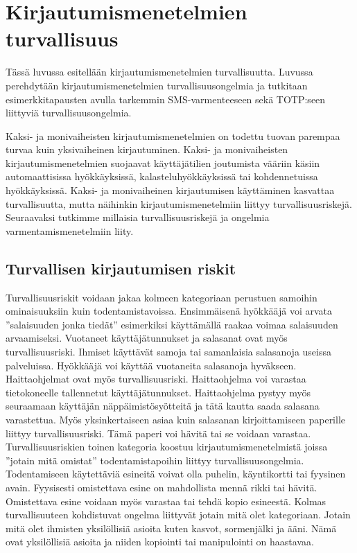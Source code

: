 \chapter{Kirjautumismenetelmien turvallisuus\label{Turvallisuus}}

Tässä luvussa esitellään kirjautumismenetelmien turvallisuutta. Luvussa perehdytään kirjautumismenetelmien turvallisuusongelmia ja tutkitaan esimerkkitapausten avulla tarkemmin SMS-varmenteeseen sekä TOTP:seen liittyviä turvallisuusongelmia. 

Kaksi- ja monivaiheisten kirjautumismenetelmien on todettu tuovan parempaa turvaa kuin yksivaiheinen kirjautuminen. Kaksi- ja monivaiheisten kirjautumismenetelmien suojaavat käyttäjätilien joutumista vääriin käsiin automaattisissa hyökkäyksissä, kalasteluhyökkäyksissä tai kohdennetuissa hyökkäyksissä. Kaksi- ja monivaiheinen kirjautumisen käyttäminen kasvattaa turvallisuutta, mutta näihinkin kirjautumismenetelmiin liittyy turvallisuusriskejä. Seuraavaksi tutkimme millaisia turvallisuusriskejä ja ongelmia varmentamismenetelmiin liity.

\section{Turvallisen kirjautumisen riskit}

Turvallisuusriskit voidaan jakaa kolmeen kategoriaan perustuen samoihin ominaisuuksiin kuin todentamistavoissa. Ensimmäisenä hyökkääjä voi arvata ”salaisuuden jonka tiedät” esimerkiksi käyttämällä raakaa voimaa salaisuuden arvaamiseksi. Vuotaneet käyttäjätunnukset ja salasanat ovat myös turvallisuusriski. Ihmiset käyttävät samoja tai samanlaisia salasanoja useissa palveluissa. Hyökkääjä voi käyttää vuotaneita salasanoja hyväkseen. Haittaohjelmat ovat myös turvallisuusriski. Haittaohjelma voi varastaa tietokoneelle tallennetut käyttäjätunnukset. Haittaohjelma pystyy myös seuraamaan käyttäjän näppäimistösyötteitä ja tätä kautta saada salasana varastettua. Myös yksinkertaiseen asiaa kuin salasanan kirjoittamiseen paperille liittyy turvallisuusriski. Tämä paperi voi hävitä tai se voidaan varastaa.
Turvallisuusriskien toinen kategoria koostuu kirjautumismenetelmistä joissa ”jotain mitä omistat” todentamistapoihin liittyy turvallisuusongelmia. Todentamiseen käytettäviä esineitä voivat olla puhelin, käyntikortti tai fyysinen avain. Fyysisesti omistettava esine on mahdollista mennä rikki tai hävitä. Omistettava esine voidaan myös varastaa tai tehdä kopio esineestä. 
Kolmas turvallisuuteen kohdistuvat ongelma liittyvät jotain mitä olet kategoriaan. Jotain mitä olet ihmisten yksilöllisiä asioita kuten kasvot, sormenjälki ja ääni. Nämä ovat yksilöllisiä asioita ja niiden kopiointi tai manipulointi on haastavaa.

